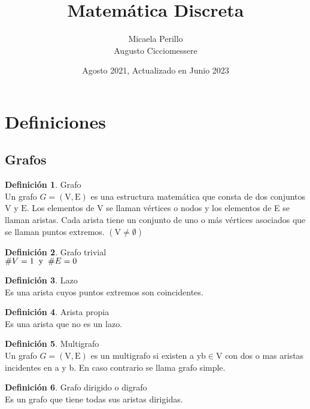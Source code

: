 \documentclass{article}
\title{Matemática Discreta}
\author{Micaela Perillo \\ Augusto Cicciomessere}
\date{Agosto 2021, Actualizado en Junio 2023}
\begin{document}
\maketitle
\thispagestyle{empty}
\pagebreak
\tableofcontents
\thispagestyle{empty}
\pagebreak
{} 

\section{Definiciones}
\theoremstyle{definition}
\newtheorem{defn}{Definición}

\subsection{Grafos}
\begin{defn}
Grafo \\ Un grafo $G=(\mathrm{V}, \mathrm{E})$ es una estructura matemática que consta de dos conjuntos $\mathrm{V}$ y $\mathrm{E}$. Los elementos de V se llaman vértices o nodos y los elementos de E se llaman aristas. Cada
arista tiene un conjunto de uno o más vértices asociados que se llaman puntos extremos. $(\mathrm{V} \neq \emptyset)$
\end{defn}

\begin{defn}
Grafo trivial \\ $\#V=1 \hspace{0.2cm} \mathrm{y} \hspace{0.2cm} \#E=0$
\end{defn}

\begin{defn}
Lazo \\ Es una arista cuyos puntos extremos son coincidentes.
\end{defn}

\begin{defn}
Arista propia \\ Es una arista que no es un lazo.
\end{defn}

\begin{defn}
Multigrafo \\ Un grafo $G=(\mathrm{V}, \mathrm{E})$ es un multigrafo si existen a $\mathrm{y} \mathrm{b} \in \mathrm{V}$ con dos o mas aristas incidentes en a y b. En caso contrario se llama grafo simple.
\end{defn}

\begin{defn}
Grafo dirigido o digrafo \\ Es un grafo que tiene todas sus aristas dirigidas.
\end{defn}
\end{document}
